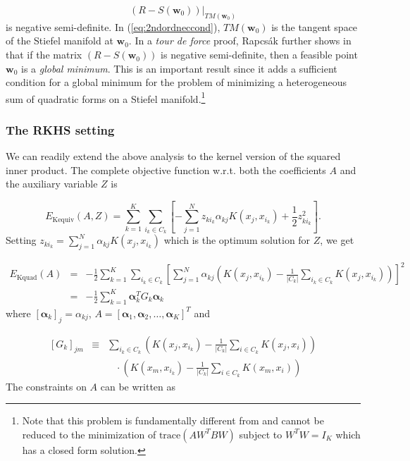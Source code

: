 \begin{equation}
\left(R-S(\mathbf{w}_{0})\right)|_{TM(\mathbf{w}_{0})}\label{eq:2ndordneccond}
\end{equation}
is negative semi-definite. In (\ref{eq:2ndordneccond}), $TM(\mathbf{w}_{0})$
is the tangent space of the Stiefel manifold at $\mathbf{w}_{0}$.
In a \emph{tour de force} proof, Rapcs\'{a}k further shows in \citep{Rapcsak2002}
that if the matrix $\left(R-S(\mathbf{w}_{0})\right)$ is negative
semi-definite, then a feasible point $\mathbf{w}_{0}$ is a \emph{global
minimum}. This is an important result since it adds a sufficient condition
for a global minimum for the problem of minimizing a heterogeneous
sum of quadratic forms on a Stiefel manifold.\footnote{Note that this problem is fundamentally different from and cannot
be reduced to the minimization of $\mathrm{trace}\left(AW^{T}BW\right)$
subject to $W^{T}W=I_{K}$ which has a closed form solution.}

\subsubsection{The RKHS setting}

We can readily extend the above analysis to the kernel version of
the squared inner product. The complete objective function w.r.t.
both the coefficients $A$ and the auxiliary variable $Z$ is 

\begin{equation}
E_{\mathrm{Kequiv}}(A,Z)=\sum_{k=1}^{K}\sum_{i_{k}\in C_{k}}\left[-\sum_{j=1}^{N}z_{ki_{k}}\alpha_{kj}K(x_{j},x_{i_{k}})+\frac{1}{2}z_{ki_{k}}^{2}\right].
\end{equation}
Setting $z_{ki_{k}}=\sum_{j=1}^{N}\alpha_{kj}K(x_{j},x_{i_{k}})$
which is the optimum solution for $Z$, we get

\begin{eqnarray}
E_{\mathrm{Kquad}}(A) & = & -\frac{1}{2}\sum_{k=1}^{K}\sum_{i_{k}\in C_{k}}\left[\sum_{j=1}^{N}\alpha_{kj}\left(K(x_{j},x_{i_{k}})-\frac{1}{|C_{k}|}\sum_{i_{k}\in C_{k}}K(x_{j},x_{i_{k}})\right)\right]^{2}\nonumber \\
 & = & -\frac{1}{2}\sum_{k=1}^{K}\boldsymbol{\alpha}_{k}^{T}G_{k}\boldsymbol{\alpha}_{k}\label{eq:EKquadalpha}
\end{eqnarray}
where $\left[\boldsymbol{\alpha}_{k}\right]_{j}=\alpha_{kj}$, $A=\left[\boldsymbol{\alpha}_{1},\boldsymbol{\alpha}_{2},\ldots,\boldsymbol{\alpha}_{K}\right]^{T}$
and

\begin{eqnarray}
\left[G_{k}\right]_{jm} & \equiv & \sum_{i_{k}\in C_{k}}\left(K(x_{j},x_{i_{k}})-\frac{1}{|C_{k}|}\sum_{i\in C_{k}}K(x_{j},x_{i})\right)\nonumber \\
 &  & \,\,\,\,\,\cdot\left(K(x_{m},x_{i_{k}})-\frac{1}{|C_{k}|}\sum_{i\in C_{k}}K(x_{m},x_{i})\right)\label{eq:Gkjm}
\end{eqnarray}
The constraints on $A$ can be written as 

